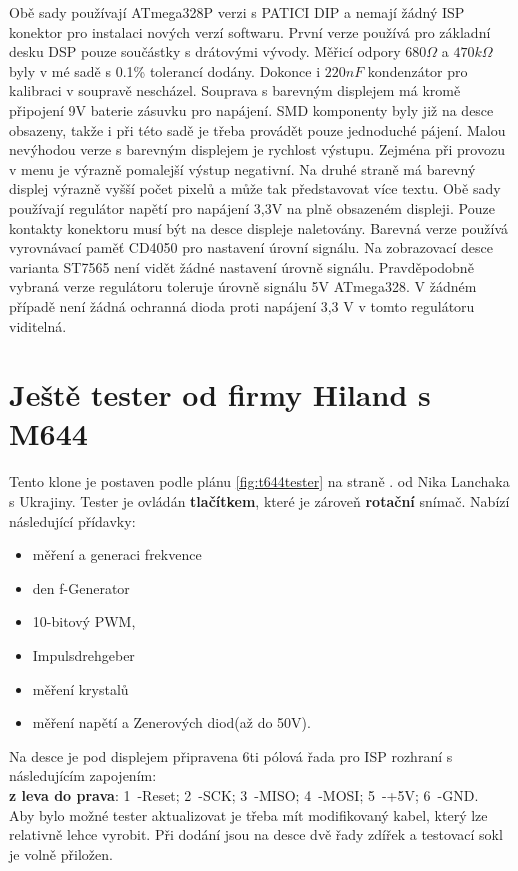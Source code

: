 Obě sady používají ATmega328P verzi s PATICI DIP a nemají žádný ISP konektor pro instalaci nových
verzí softwaru.
První verze používá pro základní desku DSP pouze součástky s drátovými vývody.
Měřicí odpory \(680\Omega\) a \(470k\Omega\) byly v mé sadě s 0.1\% tolerancí dodány.
Dokonce i \(220 nF\) kondenzátor pro kalibraci v soupravě nescházel.
Souprava s barevným displejem má kromě připojení 9V baterie zásuvku pro napájení.
SMD komponenty byly již na desce obsazeny, takže i při této sadě je třeba provádět pouze jednoduché pájení.
Malou nevýhodou verze s barevným displejem je rychlost výstupu.
Zejména při provozu v menu je výrazně pomalejší výstup negativní.
Na druhé straně má barevný displej výrazně vyšší počet pixelů a může tak představovat více textu.
Obě sady používají regulátor napětí pro napájení 3,3V na plně obsazeném displeji.
Pouze kontakty konektoru musí být na desce displeje naletovány.
Barevná verze používá vyrovnávací paměť CD4050 pro nastavení úrovní signálu.
Na zobrazovací desce varianta ST7565 není vidět žádné nastavení úrovně signálu.
Pravděpodobně vybraná verze regulátoru toleruje úrovně signálu 5V ATmega328.
V žádném případě není žádná ochranná dioda proti napájení 3,3 V v tomto regulátoru viditelná.

\section{Ještě tester od firmy Hiland s M644}
Tento  klone je postaven podle plánu \ref{fig:t644tester} na straně \pageref{T644}. od Nika Lanchaka s Ukrajiny.
Tester je ovládán \textbf {tlačítkem}, které je zároveň \textbf {rotační} snímač.
\vspace{0,5cm}
Nabízí následující přídavky:
\vspace{-1.5\baselineskip}
\begin{itemize} \setlength{\itemsep}{-0.5\baselineskip}
 \item měření a generaci frekvence
 \item den f-Generator
 \item 10-bitový PWM,
 \item Impulsdrehgeber
 \item měření krystalů
 \item měření napětí a Zenerových diod(až do 50V).
\end{itemize}
\vspace{-0.5\baselineskip}
Na desce je pod displejem připravena 6ti pólová řada pro ISP rozhraní s následujícím zapojením:\\
\textbf {z leva do prava}: 1~-Reset; 2~-SCK; 3~-MISO; 4~-MOSI; 5~-+5V; 6~-GND.\\
Aby bylo možné tester aktualizovat je třeba mít modifikovaný kabel, který lze relativně lehce vyrobit.
Při dodání jsou na desce dvě řady zdířek a testovací sokl je volně přiložen.

